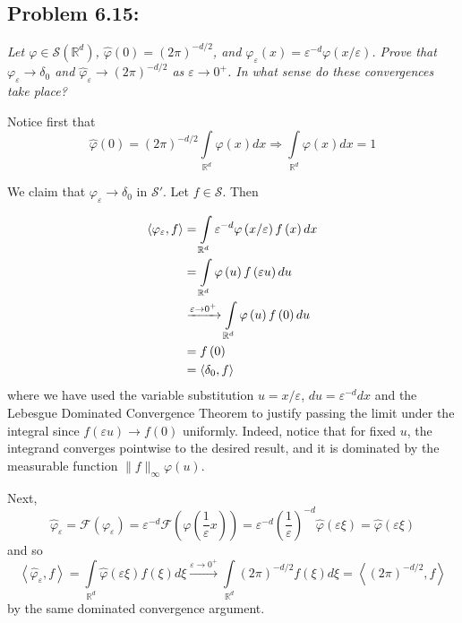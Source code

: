\documentclass[letterpaper,twoside,11pt]{article}
\theoremstyle{mystyle}
\newcommand{\R}{{\mathbb R}}
\begin{document}
\newpage 
\subsection*{Problem 6.15:}
\textit{Let $\varphi \in \mathcal S \left( \R^d \right)$, $\hat \varphi \left( 0 \right) = \left( 2\pi \right)^{-d/2}$, and $\varphi_\varepsilon \left( x \right) = \varepsilon^{-d} \varphi\left( x/\varepsilon \right)$. Prove that $\varphi_\varepsilon \to \delta_0$ and $\hat \varphi_\varepsilon \to \left( 2\pi  \right)^{-d/2}$ as $\varepsilon \to 0^+$. In what sense do these convergences take place? }

Notice first that 
\[\hat \varphi \left( 0 \right) = {\left( {2\pi } \right)^{ - d/2}}\int\limits_{{\mathbb{R}^d}} {\varphi \left( x \right)dx}  \Rightarrow \int\limits_{{\mathbb{R}^d}} {\varphi \left( x \right)dx}  = 1\]


We claim that $\varphi_\varepsilon \to \delta_0$ in $\mathcal S'$. Let $f \in \mathcal S$. Then 

\begin{align*}
  \left\langle {{\varphi _\varepsilon },f} \right\rangle  &= \int\limits_{{\mathbb{R}^d}} {{\varepsilon ^{ - d}}\varphi \left( {x/\varepsilon } \right)f\left( x \right)dx}  \hfill \\
   &= \int\limits_{{\mathbb{R}^d}} {\varphi \left( u \right)f\left( {\varepsilon u} \right)du}  \hfill \\
  &\xrightarrow{{\varepsilon  \to {0^ + }}}\int\limits_{{\mathbb{R}^d}} {\varphi \left( u \right)f\left( 0 \right)du}  \hfill \\
   &= f\left( 0 \right) \hfill \\
   &= \left\langle {{\delta _0},f} \right\rangle 
\end{align*}
where we have used the variable substitution $u = x/\varepsilon$, $du = \varepsilon^{-d} dx$ and the Lebesgue Dominated Convergence Theorem to justify passing the limit under the integral since $f(\varepsilon u) \to f(0)$ uniformly. Indeed, notice that for fixed $u$, the integrand converges pointwise to the desired result, and it is dominated by the measurable function $\|f\|_{\infty} \varphi(u)$. 

Next, 
\[{\widehat \varphi _\varepsilon } = \mathcal{F}\left( {{\varphi _\varepsilon }} \right) = {\varepsilon ^{ - d}}\mathcal{F}\left( {\varphi \left( {\frac{1}{\varepsilon }x} \right)} \right) = {\varepsilon ^{ - d}}{\left( {\frac{1}{\varepsilon }} \right)^{ - d}}\hat \varphi \left( {\varepsilon \xi } \right) = \hat \varphi \left( {\varepsilon \xi } \right)\]
and so 
\[\left\langle {{{\widehat \varphi }_\varepsilon },f} \right\rangle  = \int\limits_{{\mathbb{R}^d}} {\hat \varphi \left( {\varepsilon \xi } \right)f\left( \xi  \right)d\xi } \xrightarrow{{\varepsilon  \to {0^ + }}}\int\limits_{{\mathbb{R}^d}} {{{\left( {2\pi } \right)}^{ - d/2}}f\left( \xi  \right)d\xi }  = \left\langle {{{\left( {2\pi } \right)}^{ - d/2}},f} \right\rangle \] 
by the same dominated convergence argument. 
\end{document}
